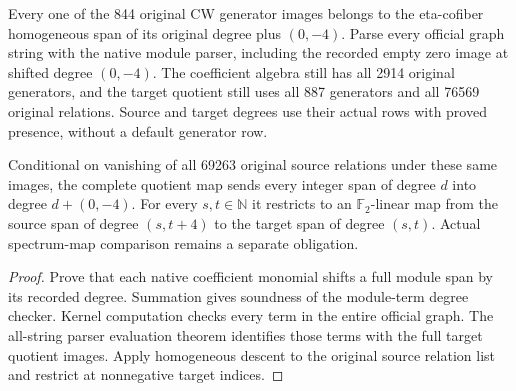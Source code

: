 \begin{proposition}
  \label{prop:lin-native-cw-map-grading}
  \leanok
  Every one of the 844 original CW generator images belongs to the
  eta-cofiber homogeneous span of its original degree plus $(0,-4)$.
  Parse every official graph string with the native module parser, including
  the recorded empty zero image at shifted degree $(0,-4)$. The coefficient
  algebra still has all 2914 original generators, and the target quotient
  still uses all 887 generators and all 76569 original relations.
  Source and target degrees use their actual rows with proved presence,
  without a default generator row.

  Conditional on vanishing of all 69263 original source relations under
  these same images, the complete quotient map sends every integer span
  of degree $d$ into degree $d+(0,-4)$. For every $s,t\in\mathbb N$ it
  restricts to an $\mathbb F_2$-linear map from the source span of degree
  $(s,t+4)$ to the target span of degree $(s,t)$.
  Actual spectrum-map comparison remains a separate obligation.
\end{proposition}
\begin{proof}
  \leanok
  Prove that each native coefficient monomial shifts a full module span by
  its recorded degree. Summation gives soundness of the module-term degree
  checker. Kernel computation checks every term in the entire official graph.
  The all-string parser evaluation theorem identifies those terms with the
  full target quotient images. Apply homogeneous descent to the original
  source relation list and restrict at nonnegative target indices.
\end{proof}

